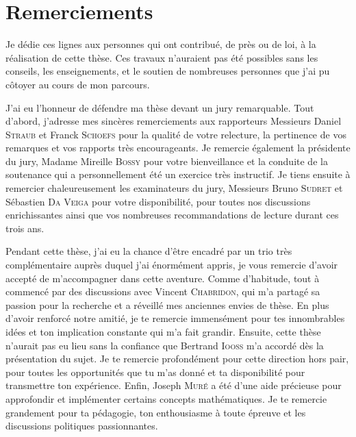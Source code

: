
\cleardoublepage
\setsinglecolumn
\chapter*{\centering \Large Remerciements}
\thispagestyle{empty}

{
\footnotesize
Je dédie ces lignes aux personnes qui ont contribué, de près ou de loi, à la réalisation de cette thèse. 
Ces travaux n'auraient pas été possibles sans les conseils, les enseignements, et le soutien de nombreuses personnes que j'ai pu côtoyer au cours de mon parcours. 

J'ai eu l'honneur de défendre ma thèse devant un jury remarquable. 
Tout d'abord, j'adresse mes sincères remerciements aux rapporteurs Messieurs Daniel \textsc{Straub} et Franck \textsc{Schoefs} pour la qualité de votre relecture, la pertinence de vos remarques et vos rapports très encourageants. 
Je remercie également la présidente du jury, Madame Mireille \textsc{Bossy} pour votre bienveillance et la conduite de la soutenance qui a personnellement été un exercice très instructif. 
Je tiens ensuite à remercier chaleureusement les examinateurs du jury, Messieurs Bruno \textsc{Sudret} et Sébastien \textsc{Da Veiga} pour votre disponibilité, pour toutes nos discussions enrichissantes ainsi que vos nombreuses recommandations de lecture durant ces trois ans.   

Pendant cette thèse, j'ai eu la chance d'être encadré par un trio très complémentaire auprès duquel j'ai énormément appris, je vous remercie d'avoir accepté de m'accompagner dans cette aventure. 
Comme d'habitude, tout à commencé par des discussions avec Vincent \textsc{Chabridon}, qui m'a partagé sa passion pour la recherche et a réveillé mes anciennes envies de thèse. 
En plus d'avoir renforcé notre amitié, je te remercie immensément pour tes innombrables idées et ton implication constante qui m'a fait grandir. 
Ensuite, cette thèse n'aurait pas eu lieu sans la confiance que Bertrand \textsc{Iooss} m'a accordé dès la présentation du sujet.   
Je te remercie profondément pour cette direction hors pair, pour toutes les opportunités que tu m'as donné et ta disponibilité pour transmettre ton expérience. 
Enfin, Joseph \textsc{Muré} a été d'une aide précieuse pour approfondir et implémenter certains concepts mathématiques. 
Je te remercie grandement pour ta pédagogie, ton enthousiasme à toute épreuve et les discussions politiques passionnantes. 

}
